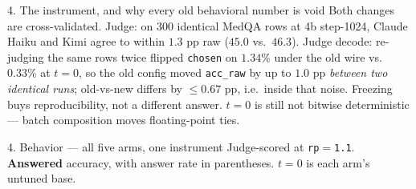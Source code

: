 \documentclass[aspectratio=169,10pt]{beamer}
\newcommand{\good}[1]{\textcolor{up}{#1}}
\newcommand{\bad}[1]{\textcolor{down}{#1}}
\begin{document}
\begin{frame}{4. The instrument, and why every old behavioral number is void}
  \vspace{0.4em}
  {\scriptsize \good{Both changes are cross-validated.} Judge: on 300 identical
  MedQA rows at 4b step-1024, Claude Haiku and Kimi agree to within $1.3$ pp raw
  ($45.0$ vs.\ $46.3$). Judge decode: re-judging the same rows twice flipped
  \texttt{chosen} on $1.34\%$ under the old wire vs.\ $0.33\%$ at $t{=}0$, so the
  old config moved \texttt{acc\_raw} by up to $1.0$ pp \emph{between two
  identical runs}; old-vs-new differs by $\leq 0.67$ pp, i.e.\ inside that
  noise. Freezing buys reproducibility, not a different answer.
  \bad{$t{=}0$ is still not bitwise deterministic} --- batch composition moves
  floating-point ties.}
\end{frame}

\begin{frame}{4. Behavior --- all five arms, one instrument}
  \small
  Judge-scored at \texttt{rp}$=$\texttt{1.1}. \textbf{Answered} accuracy, with
  answer rate in parentheses. $t{=}0$ is each arm's untuned base.


\end{frame}
\end{document}
